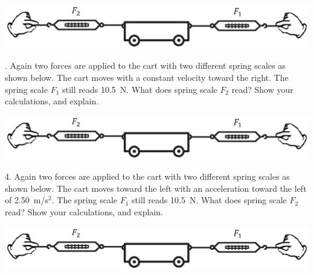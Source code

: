 \includegraphics{force_mass/cart_plus_two_scales.eps}


\answerspace{30mm}

. Again two forces are applied to the cart with two different spring scales
as shown below. The cart moves with a constant velocity toward the right. 
The spring scale \( F_{1} \) still reads 10.5~N.
What does spring scale
\( F_{2} \) read? Show your calculations, and explain.

\includegraphics{force_mass/cart_plus_two_scales.eps}

\answerspace{30mm}

4. Again two forces are applied to the cart with two different spring scales
as shown below. The cart moves toward the left with an acceleration toward the left of 2.50~m/s$^2$. 
The spring scale \( F_{1} \) still reads 10.5~N.
What does spring scale \( F_{2} \) read? Show your calculations, and
explain.

\includegraphics{force_mass/cart_plus_two_scales.eps}

\answerspace{30mm}


